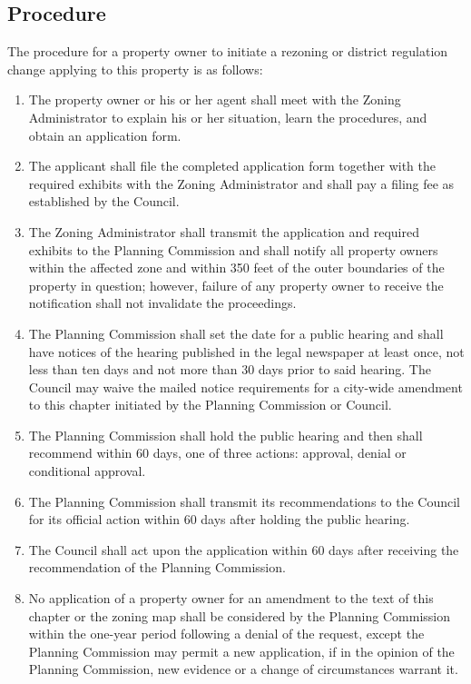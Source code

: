 \subsection{Procedure}
The procedure for a property owner to initiate a rezoning or district regulation change applying to this property is as follows:
\begin{enumerate}[{\indent}1)]
    \item The property owner or his or her agent shall meet with the Zoning Administrator to explain his or her situation, learn the procedures, and obtain an application form.
    \item The applicant shall file the completed application form together with the required exhibits with the Zoning Administrator and shall pay a filing fee as established by the Council.
    \item The Zoning Administrator shall transmit the application and required exhibits to the Planning Commission and shall notify all property owners within the affected zone and within 350 feet of the outer boundaries of the property in question; however, failure of any property owner to receive the notification shall not invalidate the proceedings.
    \item The Planning Commission shall set the date for a public hearing and shall have notices of the hearing published in the legal newspaper at least once, not less than ten days and not more than 30 days prior to said hearing. The Council may waive the mailed notice requirements for a city-wide amendment to this chapter initiated by the Planning Commission or Council.
    \item The Planning Commission shall hold the public hearing and then shall recommend within 60 days, one of three actions: approval, denial or conditional approval.
    \item The Planning Commission shall transmit its recommendations to the Council for its official action within 60 days after holding the public hearing.
    \item The Council shall act upon the application within 60 days after receiving the recommendation of the Planning Commission.
    \item No application of a property owner for an amendment to the text of this chapter or the zoning map shall be considered by the Planning Commission within the one-year period following a denial of the request, except the Planning Commission may permit a new application, if in the opinion of the Planning Commission, new evidence or a change of circumstances warrant it.
\end{enumerate}

